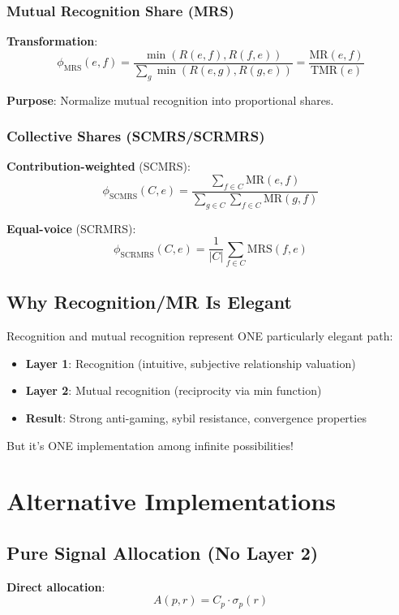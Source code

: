 \documentclass[11pt,a4paper]{article}
\theoremstyle{definition}
\theoremstyle{remark}
\begin{document}
\subsubsection{Mutual Recognition Share (MRS)}

\textbf{Transformation}:
\[ \phi_{\text{MRS}}(e,f) = \frac{\min(R(e,f), R(f,e))}{\sum_g \min(R(e,g), R(g,e))} = \frac{\text{MR}(e,f)}{\text{TMR}(e)} \]

\textbf{Purpose}: Normalize mutual recognition into proportional shares.

\subsubsection{Collective Shares (SCMRS/SCRMRS)}

\textbf{Contribution-weighted} (SCMRS):
\[ \phi_{\text{SCMRS}}(C,e) = \frac{\sum_{f \in C} \text{MR}(e,f)}{\sum_{g \in C} \sum_{f \in C} \text{MR}(g,f)} \]

\textbf{Equal-voice} (SCRMRS):
\[ \phi_{\text{SCRMRS}}(C,e) = \frac{1}{|C|} \sum_{f \in C} \text{MRS}(f,e) \]

\subsection{Why Recognition/MR Is Elegant}

Recognition and mutual recognition represent ONE particularly elegant path:
\begin{itemize}
\item \textbf{Layer 1}: Recognition (intuitive, subjective relationship valuation)
\item \textbf{Layer 2}: Mutual recognition (reciprocity via min function)
\item \textbf{Result}: Strong anti-gaming, sybil resistance, convergence properties
\end{itemize}

But it's ONE implementation among infinite possibilities!

\section{Alternative Implementations}

\subsection{Pure Signal Allocation (No Layer 2)}

\textbf{Direct allocation}:
\[ A(p,r) = C_p \cdot \sigma_p(r) \]
\end{document}
